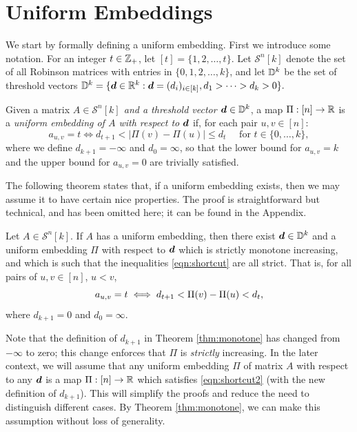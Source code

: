 \documentclass[runningheads]{llncs}
\begin{document}
\section{Uniform Embeddings}\label{chapter: the main result}


We start by formally defining a uniform embedding. First we introduce some notation. For an integer $t\in \zz_+$, let $[t]=\{1,2,\dots ,t\}$. Let $\mathcal{S}^n[k]$ denote the set of all Robinson matrices with entries in $\{ 0,1,2,\dots ,k\}$, and let $\bmD$ be the set of threshold vectors  $\bmD = \{\bmd\in\rr^k:\bmd= (d_i)_{i\in[k]}, d_1>\dots> d_k>0\}.$

\begin{definition}\label{def:uniform embedding}
Given a matrix \emph{$A\in \mathcal{S}^n[k]$ and a threshold vector $\bmd \in\bmD $}, a map $\Pi:[n]\to \rr$ is a \emph{uniform embedding of $A$ with respect to $\bmd$} if, for each pair $u,v\in[n]$:
\begin{equation}\label{eqn:shortcut}
    a_{u,v} = t\iff d_{t+1}<|\Pi(v)-\Pi(u)|\leq d_{t} \quad\text{ for }t\in\{0,\dots, k\},
\end{equation}
where we define $d_{k+1}=-\infty$ and $d_0=\infty$, so that the lower bound for $a_{u,v}=k$ and the upper bound for $a_{u,v}=0$ are trivially satisfied. 
    \end{definition}


The following theorem states that, if a uniform embedding exists, then we may assume it to have certain nice properties. The proof is straightforward but technical, and has been omitted here; it can be found in the Appendix. 

\begin{theorem}\label{thm:monotone}
Let $A\in \mathcal{S}^n[k]$. If $A$ has a uniform embedding, then there exist  $\bmd\in\bmD$ and a uniform embedding $\Pi$ with respect to $\bmd$ which is strictly monotone increasing, and which is such that the inequalities \ref{eqn:shortcut} are all strict. That is,
for all pairs of $u,v\in[n]$, $u<v$,
\begin{equation}\label{eqn:shortcut2}
    a_{u,v} = t\iff d_{t+1} < \dist uv < d_t,
\end{equation}
where $d_{k+1}=0$ and $d_0=\infty$.
\end{theorem}




Note that the definition of $d_{k+1}$ in Theorem \ref{thm:monotone} has changed from $-\infty$ to zero; this change enforces that $\Pi$ is \emph{strictly} increasing. In the later context, we will assume that any uniform embedding $\Pi$ of matrix $A$ with respect to any $\bmd$ is a  map $\Pi:[n]\rightarrow \rr$ which satisfies \cref{eqn:shortcut2} (with the new definition of $d_{k+1}$).  This will simplify the proofs and reduce the need to distinguish different cases. By Theorem \ref{thm:monotone}, we can make this assumption without loss of generality. 
\end{document}
